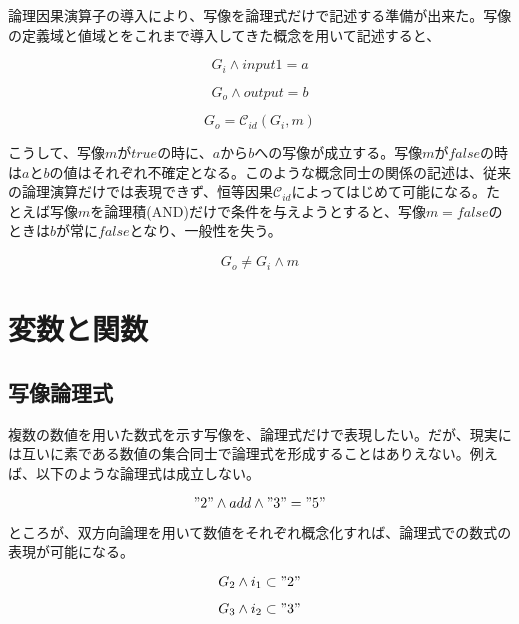 \documentclass[12pt]{article}
\begin{document}
論理因果演算子の導入により、写像を論理式だけで記述する準備が出来た。写像の定義域と値域とをこれまで導入してきた概念を用いて記述すると、

\begin{equation} G_i \wedge input1=a\end{equation}

\begin{equation} G_o \wedge output=b\end{equation}

\begin{equation} G_o=\mathcal{C}_{id}(G_i,m)\end{equation}

こうして、写像\(m\)が\(true\)の時に、\(a\)から\(b\)への写像が成立する。写像\(m\)が\(false\)の時は\(a\)と\(b\)の値はそれぞれ不確定となる。このような概念同士の関係の記述は、従来の論理演算だけでは表現できず、恒等因果\(\mathcal{C}_{id}\)によってはじめて可能になる。たとえば写像\(m\)を論理積(AND)だけで条件を与えようとすると、写像\(m=false\)のときは\(b\)が常に\(false\)となり、一般性を失う。

\begin{equation} G_o \neq G_i \wedge m\end{equation}

\clearpage
\section{変数と関数}\label{ux5909ux6570ux3068ux95a2ux6570}

\subsection{写像論理式}\label{ux5199ux50cfux8ad6ux7406ux5f0f}

複数の数値を用いた数式を示す写像を、論理式だけで表現したい。だが、現実には互いに素である数値の集合同士で論理式を形成することはありえない。例えば、以下のような論理式は成立しない。

\begin{equation} "2" \wedge add \wedge "3" = "5" \end{equation}

ところが、双方向論理を用いて数値をそれぞれ概念化すれば、論理式での数式の表現が可能になる。

\begin{equation} G_{2} \wedge i_1 \subset  "2" \end{equation}

\begin{equation} G_{3} \wedge i_2 \subset "3" \end{equation}
\end{document}
